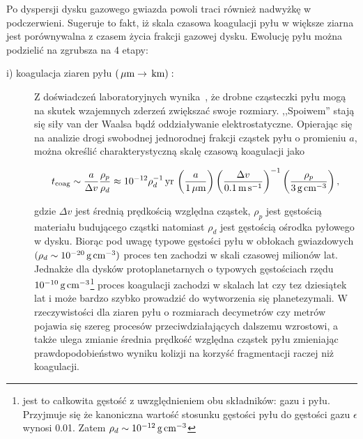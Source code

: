 \par Po dyspersji dysku gazowego gwiazda powoli traci również nadwyżkę w
podczerwieni. Sugeruje to fakt, iż skala czasowa koagulacji pyłu w większe
ziarna jest porównywalna z czasem życia frakcji gazowej dysku. Ewolucję pyłu
można podzielić na zgrubsza na 4 etapy:
\begin{description}
   \item[i) koagulacja ziaren pyłu $\left(\hbox{$\thinspace\mu\textrm{m}$} \rightarrow \hbox{$\thinspace\textrm{km}$}\right):$] 
      Z doświadczeń laboratoryjnych wynika~\cite{me}, że drob\-ne cząsteczki pyłu
      mogą na skutek wzajemnych zderzeń zwiększać swoje rozmiary. ,,Spoiwem'' stają
      się siły van der Waalsa bądź oddziaływanie elektrostatyczne. Opierając się
      na analizie drogi swobodnej jednorodnej frakcji cząstek pyłu o promieniu
      $a$, można określić charakterystyczną skalę czasową koagulacji jako 

   \begin{equation}\label{coag} 
      t_{\textrm{coag}} %
      \sim \frac{a}{\Delta v}\frac{\rho_p}{\rho_d} \approx 
      10^{-12} \rho_d^{-1}\yr\thinspace
      \left(\frac{a}{1\mum}\right)
      \left(\frac{\Delta v}{0.1\m\s^{-1}}\right)^{-1}
      \left(\frac{\rho_p}{3\g\cm^{-3}}\right),
   \end{equation}

   gdzie $\Delta v$ jest średnią prędkością względna cząstek, $\rho_p$ jest
   gęstością materiału budującego cząstki natomiast $\rho_d$ jest gęstością
   ośrodka pyłowego w dysku.  Biorąc pod uwagę typowe gęstości pyłu w obłokach
   gwiazdowych $(\rho_d \sim 10^{-20}\hbox{$\thinspace\textrm{g}$}\hbox{$\thinspace\textrm{cm}$}^{-3})$ proces ten
   zachodzi w skali czasowej milionów lat. Jednakże dla dysków protoplanetarnych
   o typowych gęstościach rzędu $10^{-10}\hbox{$\thinspace\textrm{g}$}\hbox{$\thinspace\textrm{cm}$}^{-3}$\footnote{jest to całkowita
   gęstość z uwzględnieniem obu składników: gazu i pyłu. Przyjmuje się że
kanoniczna wartość stosunku gęstości pyłu do gęstości gazu $\epsilon$ wynosi
0.01. Zatem $\rho_d \sim 10^{-12}\hbox{$\thinspace\textrm{g}$}\hbox{$\thinspace\textrm{cm}$}^{-3}$} proces
koagulacji zachodzi w skalach lat czy tez dziesiątek lat i może bardzo szybko
prowadzić do wytworzenia się planetezymali. W rzeczywistości dla ziaren pyłu o
rozmiarach decymetrów czy metrów pojawia się szereg procesów przeciwdziałających
dalszemu wzrostowi, a także ulega zmianie średnia prędkość względna cząstek pyłu
zmieniając prawdopodobieństwo wyniku kolizji na korzyść fragmentacji raczej niż
koagulacji.  


\end{description}
